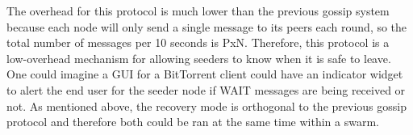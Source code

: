 The overhead for this protocol is much lower than the previous gossip
system because each node will only send a single message to its peers
each round, so the total number of messages per 10 seconds is PxN. Therefore,
this protocol is a low-overhead mechanism for allowing seeders to know when it is safe
to leave. One could imagine a GUI for a BitTorrent client could have an indicator widget
to alert the end user for the seeder node if WAIT messages are being received or not. As
mentioned above, the recovery mode is orthogonal to the previous gossip
protocol and therefore both could be ran at the same time within a swarm.
